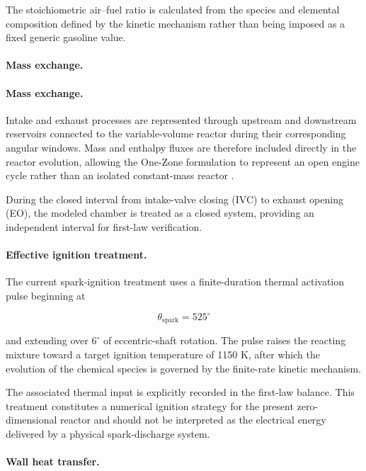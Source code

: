 \documentclass[man,floatsintext,noextraspace]{apa6}
\begin{document}
The stoichiometric air--fuel ratio is calculated from the species and elemental composition defined by the kinetic mechanism rather than being imposed as a fixed generic gasoline value.

\paragraph{Mass exchange.}
\paragraph{Mass exchange.}

Intake and exhaust processes are represented through upstream and downstream reservoirs connected to the variable-volume reactor during their corresponding angular windows. Mass and enthalpy fluxes are therefore included directly in the reactor evolution, allowing the One-Zone formulation to represent an open engine cycle rather than an isolated constant-mass reactor \cite{Cantera2025}.

During the closed interval from intake-valve closing (IVC) to exhaust opening (EO), the modeled chamber is treated as a closed system, providing an independent interval for first-law verification.

\paragraph{Effective ignition treatment.}

The current spark-ignition treatment uses a finite-duration thermal activation pulse beginning at

\begin{equation}
\theta_{\mathrm{spark}}=525^\circ
\end{equation}

and extending over $6^\circ$ of eccentric-shaft rotation. The pulse raises the reacting mixture toward a target ignition temperature of 1150 K, after which the evolution of the chemical species is governed by the finite-rate kinetic mechanism.

The associated thermal input is explicitly recorded in the first-law balance. This treatment constitutes a numerical ignition strategy for the present zero-dimensional reactor and should not be interpreted as the electrical energy delivered by a physical spark-discharge system.

\paragraph{Wall heat transfer.}
\end{document}
